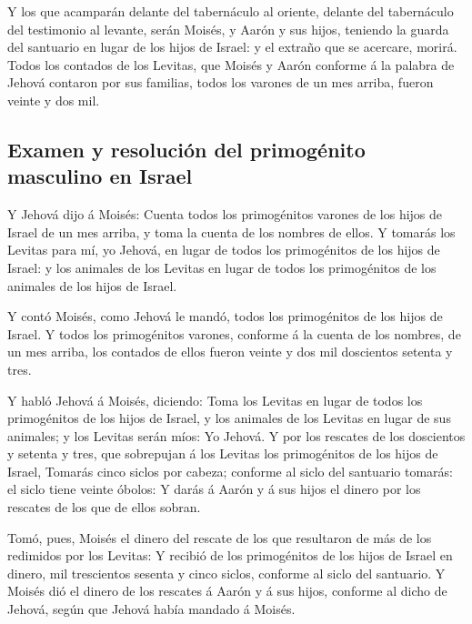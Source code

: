  Y los que acamparán delante del tabernáculo al oriente,
delante del tabernáculo del testimonio al levante, serán Moisés, y Aarón
y sus hijos, teniendo la guarda del santuario en lugar de los hijos de
Israel: y el extraño que se acercare, morirá.  Todos los
contados de los Levitas, que Moisés y Aarón conforme á la palabra de
Jehová contaron por sus familias, todos los varones de un mes arriba,
fueron veinte y dos mil.

\hypertarget{examen-y-resoluciuxf3n-del-primoguxe9nito-masculino-en-israel}{%
\subsection{Examen y resolución del primogénito masculino en
Israel}\label{examen-y-resoluciuxf3n-del-primoguxe9nito-masculino-en-israel}}

 Y Jehová dijo á Moisés: Cuenta todos los primogénitos
varones de los hijos de Israel de un mes arriba, y toma la cuenta de los
nombres de ellos.  Y tomarás los Levitas para mí, yo
Jehová, en lugar de todos los primogénitos de los hijos de Israel: y los
animales de los Levitas en lugar de todos los primogénitos de los
animales de los hijos de Israel.

 Y contó Moisés, como Jehová le mandó, todos los
primogénitos de los hijos de Israel.  Y todos los
primogénitos varones, conforme á la cuenta de los nombres, de un mes
arriba, los contados de ellos fueron veinte y dos mil doscientos setenta
y tres.

 Y habló Jehová á Moisés, diciendo:  Toma
los Levitas en lugar de todos los primogénitos de los hijos de Israel, y
los animales de los Levitas en lugar de sus animales; y los Levitas
serán míos: Yo Jehová.  Y por los rescates de los
doscientos y setenta y tres, que sobrepujan á los Levitas los
primogénitos de los hijos de Israel,  Tomarás cinco
siclos por cabeza; conforme al siclo del santuario tomarás: el siclo
tiene veinte óbolos:  Y darás á Aarón y á sus hijos el
dinero por los rescates de los que de ellos sobran.

 Tomó, pues, Moisés el dinero del rescate de los que
resultaron de más de los redimidos por los Levitas:  Y
recibió de los primogénitos de los hijos de Israel en dinero, mil
trescientos sesenta y cinco siclos, conforme al siclo del santuario.
 Y Moisés dió el dinero de los rescates á Aarón y á sus
hijos, conforme al dicho de Jehová, según que Jehová había mandado á
Moisés.

